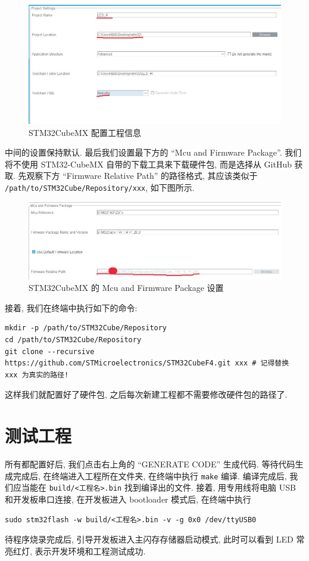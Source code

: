 \begin{figure}[H]
    \centering
    \includegraphics[width=\textwidth]{images/1-newproj-configproj.jpg}
    \caption{STM32CubeMX 配置工程信息}
\end{figure}

中间的设置保持默认. 最后我们设置最下方的 ``Mcu and Firmware Package''. 我们将不使用 STM32-CubeMX 自带的下载工具来下载硬件包, 而是选择从 GitHub 获取. 先观察下方 ``Firmware Relative Path'' 的路径格式, 其应该类似于 \texttt{/path/to/STM32Cube/Repository/xxx}, 如下图所示.

\begin{figure}[H]
    \centering
    \includegraphics[width=\textwidth]{images/1-newproj-configfirm.jpg}
    \caption{STM32CubeMX 的 Mcu and Firmware Package 设置}
\end{figure}

接着, 我们在终端中执行如下的命令:

\begin{verbatim}
mkdir -p /path/to/STM32Cube/Repository
cd /path/to/STM32Cube/Repository
git clone --recursive https://github.com/STMicroelectronics/STM32CubeF4.git xxx # 记得替换 xxx 为真实的路径!
\end{verbatim}

这样我们就配置好了硬件包, 之后每次新建工程都不需要修改硬件包的路径了.

\section{测试工程}
所有都配置好后, 我们点击右上角的 ``GENERATE CODE'' 生成代码. 等待代码生成完成后, 在终端进入工程所在文件夹, 在终端中执行 \texttt{make} 编译. 编译完成后, 我们应当能在 \texttt{build/<工程名>.bin} 找到编译出的文件. 接着, 用专用线将电脑 USB 和开发板串口连接, 在开发板进入 bootloader 模式后, 在终端中执行

\begin{verbatim}
sudo stm32flash -w build/<工程名>.bin -v -g 0x0 /dev/ttyUSB0
\end{verbatim}

待程序烧录完成后, 引导开发板进入主闪存存储器启动模式, 此时可以看到 LED 常亮红灯, 表示开发环境和工程测试成功.
